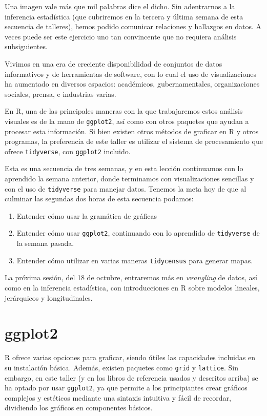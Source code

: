 \documentclass[
]{article}
\begin{document}
Una imagen vale más que mil palabras dice el dicho. Sin adentrarnos a la
inferencia estadística (que cubriremos en la tercera y última semana de
esta secuencia de talleres), hemos podido comunicar relaciones y
hallazgos en datos. A veces puede ser este ejercicio uno tan convincente
que no requiera análisis subsiguientes.

Vivimos en una era de creciente disponibilidad de conjuntos de datos
informativos y de herramientas de software, con lo cual el uso de
visualizaciones ha aumentado en diversos espacios: académicos,
gubernamentales, organizaciones sociales, prensa, e industrias varias.

En R, una de las principales maneras con la que trabajaremos estos
análisis visuales es de la mano de \texttt{ggplot2}, así como con otros
paquetes que ayudan a procesar esta información. Si bien existen otros
métodos de graficar en R y otros programas, la preferencia de este
taller es utilizar el sistema de procesamiento que ofrece
\texttt{tidyverse}, con \texttt{ggplot2} incluido.

Esta es una secuencia de tres semanas, y en esta lección continuamos con
lo aprendido la semana anterior, donde terminamos con visualizaciones
sencillas y con el uso de \texttt{tidyverse} para manejar datos. Tenemos
la meta hoy de que al culminar las segundas dos horas de esta secuencia
podamos:

\begin{enumerate}
\def\labelenumi{\arabic{enumi}.}
\item
  Entender cómo usar la gramática de gráficas
\item
  Entender cómo usar \texttt{ggplot2}, continuando con lo aprendido de
  \texttt{tidyverse} de la semana pasada.
\item
  Entender cómo utilizar en varias maneras \texttt{tidycensus} para
  generar mapas.
\end{enumerate}

La próxima sesión, del 18 de octubre, entraremos más en \emph{wrangling}
de datos, así como en la inferencia estadística, con introducciones en R
sobre modelos lineales, jerárquicos y longitudinales.

\section{ggplot2}\label{ggplot2}

R ofrece varias opciones para graficar, siendo útiles las capacidades
incluidas en su instalación básica. Además, existen paquetes como
\texttt{grid} y \texttt{lattice}. Sin embargo, en este taller (y en los
libros de referencia usados y descritos arriba) se ha optado por usar
\texttt{ggplot2}, ya que permite a los principiantes crear gráficos
complejos y estéticos mediante una sintaxis intuitiva y fácil de
recordar, dividiendo los gráficos en componentes básicos.
\end{document}
